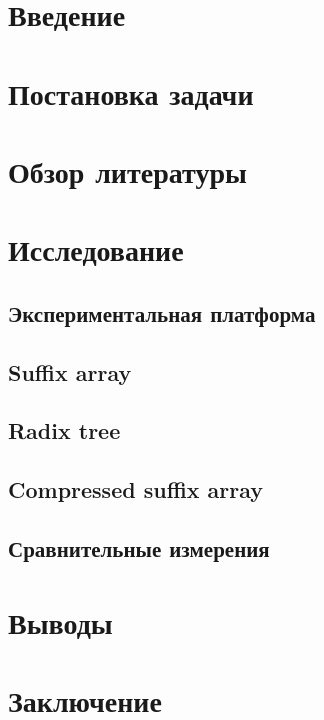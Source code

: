 \newpage
\tableofcontents
\newpage

\section{Введение}


\newpage
\section{Постановка задачи}


\newpage
\section{Обзор литературы}


\newpage
\section{Исследование}


\newpage
\subsection{Экспериментальная платформа}


\newpage
\subsection{Suffix array}


\newpage
\subsection{Radix tree}


\newpage
\subsection{Compressed suffix array}


\newpage
\subsection{Сравнительные измерения}


\newpage
\section{Выводы}


\newpage
\section{Заключение}


\newpage




